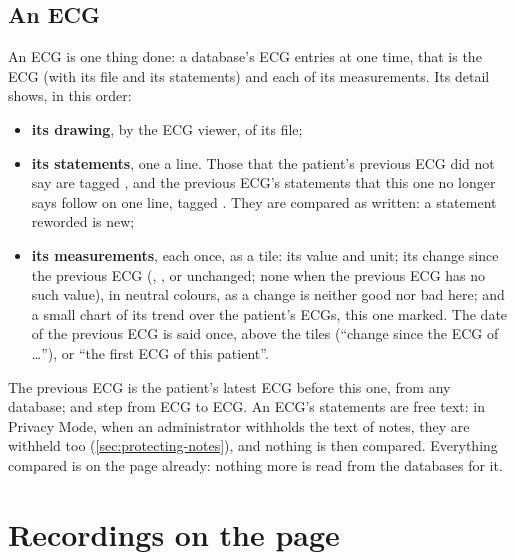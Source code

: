 \subsection{An ECG}
\label{sec:patients-ecg}

An ECG is one thing done: a database's ECG entries at one time, that is the ECG (with its file
and its statements) and each of its measurements. Its detail shows, in this order:
\begin{itemize}
\item \textbf{its drawing}, by the ECG viewer, of its file;
\item \textbf{its statements}, one a line. Those that the patient's previous ECG did not say are
  tagged , and the previous ECG's statements that this one no longer says follow on one
  line, tagged . They are compared as written: a statement reworded is new;
\item \textbf{its measurements}, each once, as a tile: its value and unit; its change since the
  previous ECG (, , or \ui{=} unchanged; none when the previous ECG has
  no such value), in neutral colours, as a change is neither good nor bad here; and a small chart
  of its trend over the patient's ECGs, this one marked. The date of the previous ECG is said
  once, above the tiles (``change since the ECG of \dots''), or ``the first ECG of this patient''.
\end{itemize}
The previous ECG is the patient's latest ECG before this one, from any database; \ui{$\langle$}
and \ui{$\rangle$} step from ECG to ECG. An ECG's statements are free text: in Privacy Mode,
when an administrator withholds the text of notes, they are withheld too
(\cref{sec:protecting-notes}), and nothing is then compared.
Everything compared is on the page already: nothing more is read from the databases for it.

\section{Recordings on the page}
\label{sec:patients-recordings}


